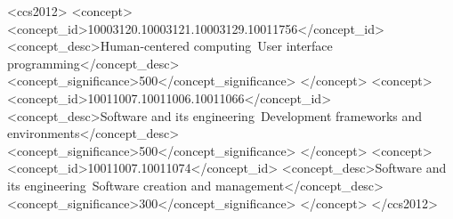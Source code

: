 \documentclass[sigplan,screen,english]{acmart}
\begin{document}

\begin{abstract}
\end{abstract}

%

\begin{CCSXML}
<ccs2012>
<concept>
<concept_id>10003120.10003121.10003129.10011756</concept_id>
<concept_desc>Human-centered computing~User interface programming</concept_desc>
<concept_significance>500</concept_significance>
</concept>
<concept>
<concept_id>10011007.10011006.10011066</concept_id>
<concept_desc>Software and its engineering~Development frameworks and environments</concept_desc>
<concept_significance>500</concept_significance>
</concept>
<concept>
<concept_id>10011007.10011074</concept_id>
<concept_desc>Software and its engineering~Software creation and management</concept_desc>
<concept_significance>300</concept_significance>
</concept>
</ccs2012>
\end{CCSXML}



%
%



\maketitle
\renewcommand{\shortauthors}{Lincke, Rein, Ramson, Hirschfeld, Taeumel, Felgentreff}
\end{document}
